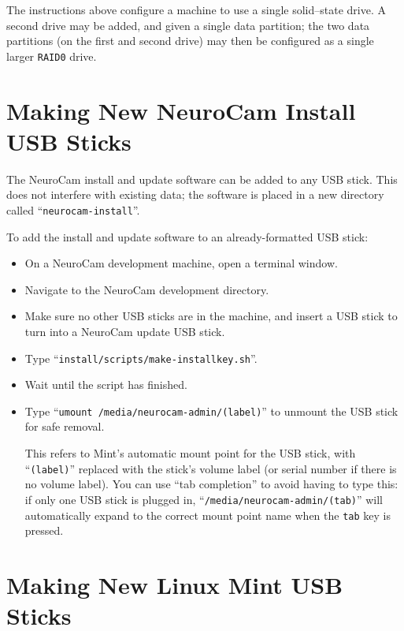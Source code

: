 The instructions above configure a machine to use a single solid--state drive.
A second drive may be added, and given a single data partition; the two data
partitions (on the first and second drive) may then be configured as a single
larger \verb+RAID0+ drive.



%
%
\section{Making New NeuroCam Install USB Sticks}
\label{machine-usb}

The NeuroCam install and update software can be added to any USB stick. This
does not interfere with existing data; the software is placed in a new
directory called ``\verb+neurocam-install+''.

To add the install and update software to an already-formatted USB stick:
\begin{itemize}
\item On a NeuroCam development machine, open a terminal window.
\item Navigate to the NeuroCam development directory.
\item Make sure no other USB sticks are in the machine, and insert a USB
stick to turn into a NeuroCam update USB stick.
\item Type ``\verb+install/scripts/make-installkey.sh+''.
\item Wait until the script has finished.
\item Type ``\verb+umount /media/neurocam-admin/(label)+'' to unmount the
USB stick for safe removal.
\par
This refers to Mint's automatic mount point for the USB stick, with 
``\verb+(label)+'' replaced with the stick's volume label (or serial number if
there is no volume label). You can use ``tab completion'' to avoid having to
type this: if only one USB stick is plugged in,
``\verb+/media/neurocam-admin/(tab)+'' will automatically expand to the
correct mount point name when the \verb+tab+ key is pressed.
\end{itemize}

%
%
\section{Making New Linux Mint USB Sticks}
\label{machine-usbmint}

